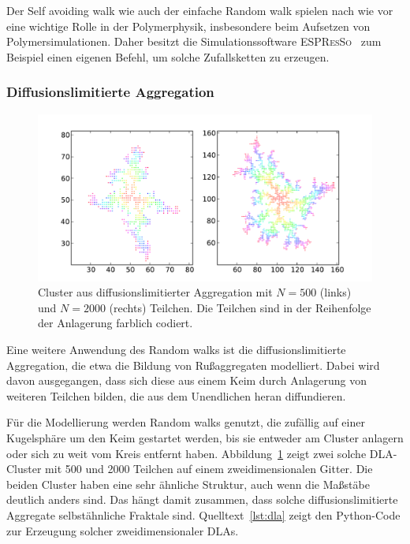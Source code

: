 Der Self avoiding walk wie auch der einfache Random walk spielen
nach wie vor eine wichtige Rolle in der Polymerphysik, insbesondere
beim Aufsetzen von Polymersimulationen. Daher besitzt die
Simulationssoftware \textsc{ESPResSo}~\cite{espresso} zum Beispiel
einen eigenen Befehl, um solche Zufallsketten zu erzeugen.

\subsubsection{Diffusionslimitierte Aggregation}

\begin{figure}
  \centering
  \includegraphics[width=\textwidth]{plots/dla}
  \caption{Cluster aus diffusionslimitierter Aggregation mit $N=500$
    (links) und $N=2000$ (rechts) Teilchen. Die Teilchen sind in der
    Reihenfolge der Anlagerung farblich codiert.}
  \label{fig:dla}
\end{figure}

Eine weitere Anwendung des Random walks ist die diffusionslimitierte
Aggregation, die etwa die Bildung von Rußaggregaten modelliert. Dabei
wird davon ausgegangen, dass sich diese aus einem Keim durch
Anlagerung von weiteren Teilchen bilden, die aus dem Unendlichen heran
diffundieren.

Für die Modellierung werden Random walks genutzt, die zufällig auf
einer Kugelsphäre um den Keim gestartet werden, bis sie entweder am
Cluster anlagern oder sich zu weit vom Kreis entfernt
haben. Abbildung~\ref{fig:dla} zeigt zwei solche DLA-Cluster mit 500
und 2000 Teilchen auf einem zweidimensionalen Gitter. Die beiden
Cluster haben eine sehr ähnliche Struktur, auch wenn die Maßstäbe
deutlich anders sind. Das hängt damit zusammen, dass solche
diffusionslimitierte Aggregate selbstähnliche Fraktale
sind. Quelltext~\ref{lst:dla} zeigt den Python-Code zur Erzeugung
solcher zweidimensionaler DLAs.


